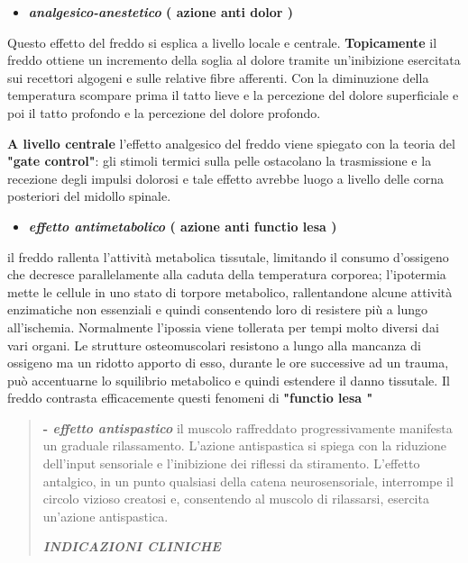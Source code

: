 \documentclass[]{article}
\begin{document}
\begin{itemize}
\item
  \textbf{\emph{analgesico-anestetico} ( azione anti dolor )}
\end{itemize}

Questo effetto del freddo si esplica a livello locale e centrale.
\textbf{Topicamente} il freddo ottiene un incremento della soglia al
dolore tramite un'inibizione esercitata sui recettori algogeni e sulle
relative fibre afferenti. Con la diminuzione della temperatura scompare
prima il tatto lieve e la percezione del dolore superficiale e poi il
tatto profondo e la percezione del dolore profondo.

\textbf{A livello centrale} l'effetto analgesico del freddo viene
spiegato con la teoria del \textbf{"gate control"}: gli stimoli termici
sulla pelle ostacolano la trasmissione e la recezione degli impulsi
dolorosi e tale effetto avrebbe luogo a livello delle corna posteriori
del midollo spinale.

\begin{itemize}
\item
  \textbf{\emph{effetto antimetabolico} ( azione anti functio lesa )}
\end{itemize}

il freddo rallenta l'attività metabolica tissutale, limitando il consumo
d'ossigeno che decresce parallelamente alla caduta della temperatura
corporea; l'ipotermia mette le cellule in uno stato di torpore
metabolico, rallentandone alcune attività enzimatiche non essenziali e
quindi consentendo loro di resistere più a lungo all'ischemia.
Normalmente l'ipossia viene tollerata per tempi molto diversi dai vari
organi. Le strutture osteomuscolari resistono a lungo alla mancanza di
ossigeno ma un ridotto apporto di esso, durante le ore successive ad un
trauma, può accentuarne lo squilibrio metabolico e quindi estendere il
danno tissutale. Il freddo contrasta efficacemente questi fenomeni di
\textbf{"functio lesa "}

\begin{quote}
\textbf{- \emph{effetto antispastico }}il muscolo raffreddato
progressivamente manifesta un graduale rilassamento. L'azione
antispastica si spiega con la riduzione dell'input sensoriale e
l'inibizione dei riflessi da stiramento. L'effetto antalgico, in un
punto qualsiasi della catena neurosensoriale, interrompe il circolo
vizioso creatosi e, consentendo al muscolo di rilassarsi, esercita
un'azione antispastica.

\textbf{\emph{INDICAZIONI CLINICHE }}
\end{quote}
\end{document}
